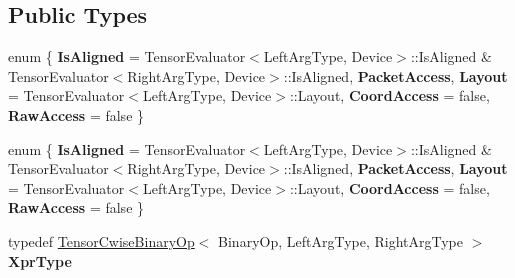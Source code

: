 \subsection*{Public Types}
\begin{DoxyCompactItemize}
\item 
\mbox{\label{struct_eigen_1_1_tensor_evaluator_3_01const_01_tensor_cwise_binary_op_3_01_binary_op_00_01_left_d0674d2fbf9b5f3fd40347d3eda7a38d_a384e2c331067c2f365a9e8cbe1472040}} 
enum \{ \newline
{\bfseries Is\+Aligned} = Tensor\+Evaluator$<$Left\+Arg\+Type, Device$>$\+:\+:Is\+Aligned \& Tensor\+Evaluator$<$Right\+Arg\+Type, Device$>$\+:\+:Is\+Aligned, 
{\bfseries Packet\+Access}, 
{\bfseries Layout} = Tensor\+Evaluator$<$Left\+Arg\+Type, Device$>$\+:\+:Layout, 
{\bfseries Coord\+Access} = false, 
\newline
{\bfseries Raw\+Access} = false
 \}
\item 
\mbox{\label{struct_eigen_1_1_tensor_evaluator_3_01const_01_tensor_cwise_binary_op_3_01_binary_op_00_01_left_d0674d2fbf9b5f3fd40347d3eda7a38d_a13672aee5f477b933bc5f1427c1ebb13}} 
enum \{ \newline
{\bfseries Is\+Aligned} = Tensor\+Evaluator$<$Left\+Arg\+Type, Device$>$\+:\+:Is\+Aligned \& Tensor\+Evaluator$<$Right\+Arg\+Type, Device$>$\+:\+:Is\+Aligned, 
{\bfseries Packet\+Access}, 
{\bfseries Layout} = Tensor\+Evaluator$<$Left\+Arg\+Type, Device$>$\+:\+:Layout, 
{\bfseries Coord\+Access} = false, 
\newline
{\bfseries Raw\+Access} = false
 \}
\item 
\mbox{\label{struct_eigen_1_1_tensor_evaluator_3_01const_01_tensor_cwise_binary_op_3_01_binary_op_00_01_left_d0674d2fbf9b5f3fd40347d3eda7a38d_a81c6ae363453124fe42d8c8e13c578d8}} 
typedef \hyperlink{class_eigen_1_1_tensor_cwise_binary_op}{Tensor\+Cwise\+Binary\+Op}$<$ Binary\+Op, Left\+Arg\+Type, Right\+Arg\+Type $>$ {\bfseries Xpr\+Type}
\item 
\mbox{\label{struct_eigen_1_1_tensor_evaluator_3_01const_01_tensor_cwise_binary_op_3_01_binary_op_00_01_left_d0674d2fbf9b5f3fd40347d3eda7a38d_a98eadf3d9a0cc615079189945d9bd7b1}} 

\end{DoxyCompactItemize}
